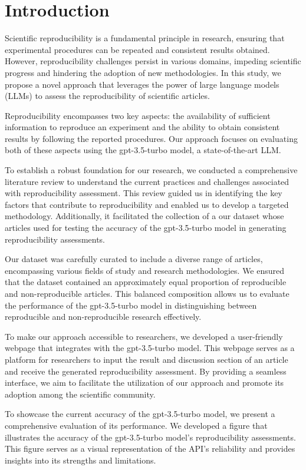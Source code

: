\documentclass[12pt, a4paper, twocolumn]{article}
\begin{document}
	\section{Introduction}
	Scientific reproducibility is a fundamental principle in research, ensuring that experimental procedures can be repeated and consistent results obtained. However, reproducibility challenges persist in various domains, impeding scientific progress and hindering the adoption of new methodologies. In this study, we propose a novel approach that leverages the power of large language models (LLMs) to assess the reproducibility of scientific articles.
	
	Reproducibility encompasses two key aspects: the availability of sufficient information to reproduce an experiment and the ability to obtain consistent results by following the reported procedures. Our approach focuses on evaluating both of these aspects using the gpt-3.5-turbo model, a state-of-the-art LLM.
	
	To establish a robust foundation for our research, we conducted a comprehensive literature review to understand the current practices and challenges associated with reproducibility assessment. This review guided us in identifying the key factors that contribute to reproducibility and enabled us to develop a targeted methodology. Additionally, it facilitated the collection of a our dataset whose articles used for testing the accuracy of the gpt-3.5-turbo model in generating reproducibility assessments.
	
	Our dataset was carefully curated to include a diverse range of articles, encompassing various fields of study and research methodologies. We ensured that the dataset contained an approximately equal proportion of reproducible and non-reproducible articles. This balanced composition allows us to evaluate the performance of the gpt-3.5-turbo model in distinguishing between reproducible and non-reproducible research effectively.
	
	To make our approach accessible to researchers, we developed a user-friendly webpage that integrates with the gpt-3.5-turbo model. This webpage serves as a platform for researchers to input the result and discussion section of an article and receive the generated reproducibility assessment. By providing a seamless interface, we aim to facilitate the utilization of our approach and promote its adoption among the scientific community.
	
	To showcase the current accuracy of the gpt-3.5-turbo model, we present a comprehensive evaluation of its performance. We developed a figure that illustrates the accuracy of the gpt-3.5-turbo model's reproducibility assessments. This figure serves as a visual representation of the API's reliability and provides insights into its strengths and limitations.
	
\end{document}
